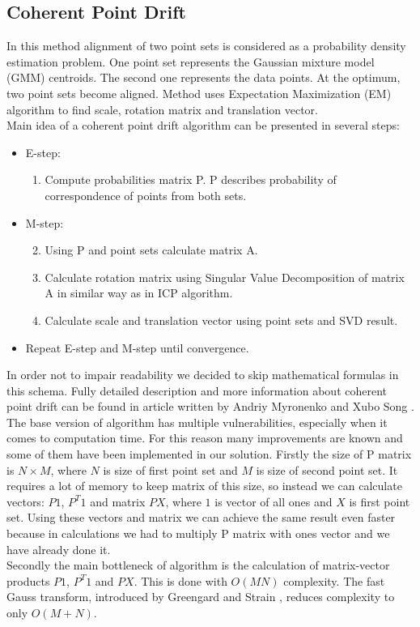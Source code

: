 \documentclass[titlepage]{article}
\begin{document}
\subsection{Coherent Point Drift}

In this method alignment of two point sets is considered as a probability density estimation problem. One point set represents the Gaussian mixture model (GMM) centroids. The second one represents the data points. At the optimum, two point sets become aligned. Method uses Expectation Maximization (EM) algorithm to find scale, rotation matrix and translation vector.\\
Main idea of a coherent point drift algorithm can be presented in several steps:
\begin{itemize}[label={}]
\item E-step:
\begin{enumerate}
\item Compute probabilities matrix P. P describes probability of correspondence of points from both sets.
\end{enumerate}
\item M-step: 
\begin{enumerate}
\setcounter{enumi}{1}
\item Using P and point sets calculate matrix A.
\item Calculate rotation matrix using Singular Value Decomposition of matrix A in similar way as in ICP algorithm.
\item Calculate scale and translation vector using point sets and SVD result.
\end{enumerate}
\item Repeat E-step and M-step until convergence.
\end{itemize}
In order not to impair readability we decided to skip mathematical formulas in this schema. Fully detailed description and more information about coherent point drift can be found in article written by Andriy Myronenko and Xubo Song \cite{cpd}.\\
The base version of algorithm has multiple vulnerabilities, especially when it comes to computation time.
For this reason many improvements are known and some of them have been implemented in our solution. Firstly the size of P matrix is $N \times M$, where $N$ is size of first point set and $M$ is size of second point set. It requires a lot of memory to keep matrix of this size, so instead we can calculate vectors: $P1$, $P^T 1$ and matrix $PX$, where $1$ is vector of all ones and $X$ is first point set. Using these vectors and matrix we can achieve the same result even faster because in calculations we had to multiply P matrix with ones vector and we have already done it.\\
Secondly the main bottleneck of algorithm is the calculation of matrix-vector products $P1$, $P^T1$ and $PX$. This is done with $O(MN)$ complexity. The fast Gauss transform, introduced by Greengard and Strain \cite{fgt}, reduces complexity to only $O(M+N)$.
\end{document}
